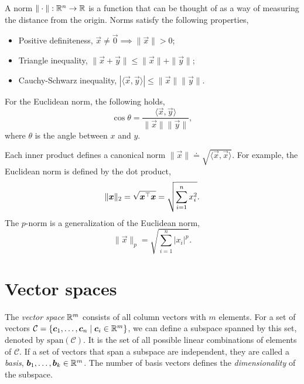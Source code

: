 \documentclass[justified,nobib]{tufte-handout}
\newcommand{\ang}[1]{\langle #1 \rangle}
\begin{document}
\begin{definition}[Norm]
    A norm $\|\cdot\|: \mathbb{R}^n \to \mathbb{R}$ is a function that can be thought of as a way of measuring the distance from the origin.
    Norms satisfy the following properties,
    \begin{itemize}
        \item Positive definiteness, $\vec{x} \neq \vec{0} \implies \|\vec{x}\| > 0$;
        \item Triangle inequality, $\|\vec{x}+\vec{y}\| \leq \|\vec{x}\| + \|\vec{y}\|$;
        \item Cauchy-Schwarz inequality, $|\ang{\vec{x},\vec{y}}| \leq \|\vec{x}\| \|\vec{y}\|$.
    \end{itemize}
\end{definition}

\begin{corollary}
    For the Euclidean norm, the following holds, \[
        \cos \theta = \frac{\ang{\vec{x},\vec{y}}}{\|\vec{x}\| \|\vec{y}\|},
    \]
    where $\theta$ is the angle between $x$ and $y$.
\end{corollary}

Each inner product defines a canonical norm $\|\vec{x}\| \doteq \sqrt{\ang{\vec{x},\vec{x}}}$. For
example, the Euclidean norm is defined by the dot product, \[
    \|\bm{x}\|_2 = \sqrt{\bm{x}^\top\bm{x}} = \sqrt{\sum_{i=1}^{n} x_i^2}.
\]
The $p$-norm is a generalization of the Euclidean norm, \[
    \|\vec{x}\|_p = \sqrt{\sum_{i=1}^{n} |x_i|^p}.
\]

\section{Vector spaces}

The \textit{vector space} $\mathbb{R}^m$ consists of all column vectors with $m$ elements. For a set of
vectors $\mathcal{C} = \{ \bm{c}_1,\ldots,\bm{c}_n \mid \bm{c}_i \in \mathbb{R}^m \}$, we can define a
subspace spanned by this set, denoted by $\mathrm{span}(\mathcal{C})$. It is the set of all
possible linear combinations of elements of $\mathcal{C}$. If a set of vectors that span a subspace
are independent, they are called a \textit{basis}, $\bm{b}_1,\ldots,\bm{b}_k \in \mathbb{R}^m$. The
number of basis vectors defines the \textit{dimensionality} of the subspace.
\end{document}
